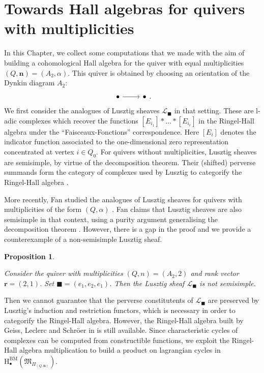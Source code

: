 \documentclass[11pt,english]{article}
\numberwithin{equation}{section}
\numberwithin{figure}{section}
\theoremstyle{definition}
\theoremstyle{plain}
\newtheorem{prop}[df]{Proposition}
\theoremstyle{remark}
\newcommand\nn{\mathbf{n}}
\newcommand\rr{\mathbf{r}}
\newcommand\HH{\mathrm{H}}
\begin{document}
\pagebreak{}

\section{Towards Hall algebras for quivers with multiplicities \label{Chap/HallAlg}}

In this Chapter, we collect some computations that we made with the
aim of building a cohomological Hall algebra for the quiver with equal
multiplicities $(Q,\nn)=(A_{2},\alpha)$. This quiver is obtained
by choosing an orientation of the Dynkin diagram $A_{2}$:\[
\begin{tikzcd}[ampersand replacement=\&]
\bullet \ar[r] \& \bullet
\end{tikzcd}
.
\]We first consider the analogues of Lusztig sheaves $\mathcal{L}_{\blacksquare}$
in that setting. These are l-adic complexes which recover the functions
$[E_{i_{1}}]*\ldots*[E_{i_{r}}]$ in the Ringel-Hall algebra under
the ``Faisceaux-Fonctions'' correspondence. Here $[E_{i}]$ denotes
the indicator function associated to the one-dimensional zero representation
concentrated at vertex $i\in Q_{0}$. For quivers without multiplicities,
Lusztig sheaves are semisimple, by virtue of the decomposition theorem.
Their (shifted) perverse summands form the category of complexes used
by Lusztig to categorify the Ringel-Hall algebra \cite{Lus91}.

More recently, Fan studied the analogues of Lusztig sheaves for quivers
with multiplicities of the form $(Q,\alpha)$ \cite{Fan14}. Fan claims
that Lusztig sheaves are also semisimple in that context, using a
purity argument generalising the decomposition theorem \cite[Prop. 2.]{Fan14}.
However, there is a gap in the proof and we provide a counterexample
of a non-semisimple Lusztig sheaf.

\begin{prop} \label{Prop/Ch5SemisimpFail}

Consider the quiver with multiplicities $(Q,n)=(A_{2},2)$ and rank
vector $\rr=(2,1)$. Set $\blacksquare=(e_{1},e_{2},e_{1})$. Then
the Lusztig sheaf $\mathcal{L}_{\blacksquare}$ is not semisimple.

\end{prop}

Then we cannot guarantee that the perverse constitutents of $\mathcal{L}_{\blacksquare}$
are preserved by Lusztig's induction and restriction functors, which
is necessary in order to categorify the Ringel-Hall algebra. However,
the Ringel-Hall algebra built by Geiss, Leclerc and Schröer in \cite{GLS16}
is still available. Since characteristic cycles of complexes can be
computed from constructible functions, we exploit the Ringel-Hall
algebra multiplication to build a product on lagrangian cycles in
$\HH_{\bullet}^{\mathrm{BM}}(\mathfrak{M}_{\Pi_{(Q,\nn)}})$.
\end{document}
